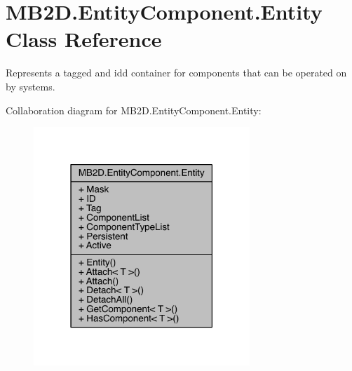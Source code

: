 \hypertarget{class_m_b2_d_1_1_entity_component_1_1_entity}{}\section{M\+B2\+D.\+Entity\+Component.\+Entity Class Reference}
\label{class_m_b2_d_1_1_entity_component_1_1_entity}


Represents a tagged and id\textquotesingle{}d container for components that can be operated on by systems.  




Collaboration diagram for M\+B2\+D.\+Entity\+Component.\+Entity\+:
\nopagebreak
\begin{figure}[H]
\begin{center}
\leavevmode
\includegraphics[width=231pt]{class_m_b2_d_1_1_entity_component_1_1_entity__coll__graph}
\end{center}
\end{figure}
